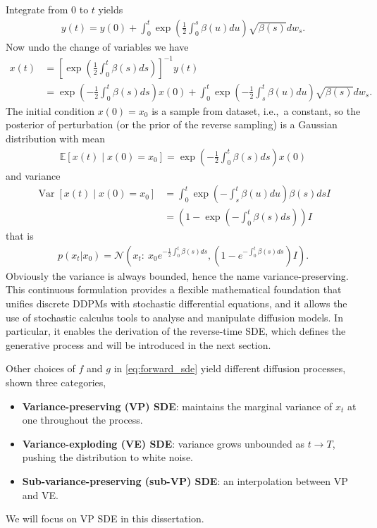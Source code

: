 \documentclass[a4paper,12pt]{article}
\DeclareMathOperator{\Var}{Var} %
\begin{document}
Integrate from \(0\) to \(t\) yields
\begin{align*}
    y\!\left(t\right)=y\!\left(0\right)+\int_0^t\exp\left(\frac{1}{2}\int_0^s\beta\!\left(u\right)du\right)\sqrt{\beta\!\left(s\right)}dw_s.
\end{align*}
Now undo the change of variables we have
\begin{align*}
    x\!\left(t\right)
    &=\left[\exp\left(\frac{1}{2}\int_0^t\beta\!\left(s\right)ds\right)\right]^{-1}y\!\left(t\right)\\
    &=\exp\left(-\frac{1}{2}\int_0^t\beta\!\left(s\right)ds\right)x\!\left(0\right)+\int_0^t\exp\left(-\frac{1}{2}\int_s^t\beta\!\left(u\right)du\right)\sqrt{\beta\!\left(s\right)}dw_s.
\end{align*}
The initial condition \(x\!\left(0\right)=x_0\) is a sample from dataset, i.e.,~a constant, so the posterior of perturbation (or the prior of the reverse sampling) is a Gaussian distribution with mean
\begin{align*}
    \mathbb{E}\left[x\!\left(t\right)\mid x\!\left(0\right)=x_0\right]=\exp\left(-\frac{1}{2}\int_0^t\beta\!\left(s\right)ds\right)x\!\left(0\right)
\end{align*}
and variance
\begin{align*}
    \Var\left[x\!\left(t\right)\mid x\!\left(0\right)=x_0\right]
    &=\int_0^t\exp\left(-\int_s^t\beta\!\left(u\right)du\right)\beta\!\left(s\right)ds I\\
    &=\left(1-\exp\left(-\int_0^t\beta\!\left(s\right)ds\right)\right)I
\end{align*}
that is
\begin{align*}
    p\!\left(x_t|x_0\right)=\mathcal{N}\left(x_t:\:x_0e^{-\frac{1}{2}\int_0^t\beta(s)ds},\left(1-e^{-\int_0^t\beta(s)ds}\right)I\right).
\end{align*}
Obviously the variance is always bounded, hence the name variance-preserving. This continuous formulation provides a flexible mathematical foundation that unifies discrete DDPMs with stochastic differential equations, and it allows the use of stochastic calculus tools to analyse and manipulate diffusion models. In particular, it enables the derivation of the reverse-time SDE, which defines the generative process and will be introduced in the next section.

Other choices of \(f\) and \(g\) in \cref{eq:forward_sde} yield different diffusion processes, \citet{song2021ScoreBasedGenerativeModeling} shown three categories,
\begin{itemize}
    \item \textbf{Variance-preserving (VP) SDE}: maintains the marginal variance of \(x_t\) at one throughout the process.  
    \item \textbf{Variance-exploding (VE) SDE}: variance grows unbounded as \(t \to T\), pushing the distribution to white noise.  
    \item \textbf{Sub-variance-preserving (sub-VP) SDE}: an interpolation between VP and VE.  
\end{itemize}
We will focus on VP SDE in this dissertation.
\end{document}

